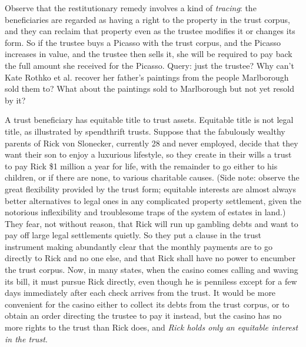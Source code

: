 Observe that the restitutionary remedy involves a kind of \textit{tracing}: the
beneficiaries are regarded as having a right to the property in the trust
corpus, and they can reclaim that property even as the trustee modifies it or
changes its form. So if the trustee buys a Picasso with the trust corpus, and
the Picasso increases in value, and the trustee then sells it, she will be
required to pay back the full amount she received for the Picasso. Query: just
the trustee? Why can't Kate Rothko et al. recover her father's paintings from
the people Marlborough sold them to? What about the paintings sold to
Marlborough but not yet resold by it?



\item A trust beneficiary has equitable title to trust assets. Equitable title
is not legal title, as illustrated by spendthrift trusts. Suppose that the
fabulously wealthy parents of Rick von Slonecker, currently 28 and never
employed, decide that they want their son to enjoy a luxurious lifestyle, so
they create in their wills a trust to pay Rick \$1 million a year for life, with
the remainder to go either to his children, or if there are none, to various
charitable causes. (Side note: observe the great flexibility provided by the
trust form; equitable interests are almost always better alternatives to legal
ones in any complicated property settlement, given the notorious inflexibility
and troublesome traps of the system of estates in land.) They fear, not without
reason, that Rick will run up gambling debts and want to pay off large legal
settlements quietly. So they put a clause in the trust instrument making
abundantly clear that the monthly payments are to go directly to Rick and no one
else, and that Rick shall have no power to encumber the trust corpus. Now, in
many states, when the casino comes calling and waving its bill, it must pursue
Rick directly, even though he is penniless except for a few days immediately
after each check arrives from the trust. It would be more convenient for the
casino either to collect its debts from the trust corpus, or to obtain an order
directing the trustee to pay it instead, but the casino has no more rights to
the trust than Rick does, and \textit{Rick holds only an equitable interest in
the trust}. 


